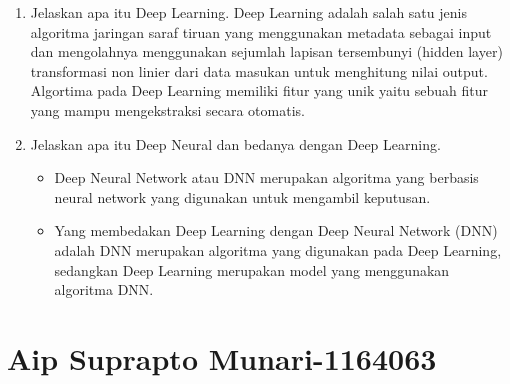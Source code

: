 \begin{enumerate}
\item Jelaskan apa itu Deep Learning.
\subitem Deep Learning adalah salah satu jenis algoritma jaringan saraf tiruan yang menggunakan metadata sebagai input dan mengolahnya menggunakan sejumlah lapisan tersembunyi (hidden layer) transformasi non linier dari data masukan untuk menghitung nilai output. Algortima pada Deep Learning memiliki fitur yang unik yaitu sebuah fitur yang mampu mengekstraksi secara otomatis.

\item Jelaskan apa itu Deep Neural dan bedanya dengan Deep Learning.
\begin{itemize}
\item Deep Neural Network atau DNN merupakan algoritma yang berbasis neural network yang digunakan untuk mengambil keputusan.

\item Yang membedakan Deep Learning dengan  Deep Neural Network (DNN) adalah DNN merupakan algoritma yang digunakan pada Deep Learning, sedangkan Deep Learning merupakan model yang menggunakan algoritma DNN.
\end{itemize}
\end{enumerate}

\section{Aip Suprapto Munari-1164063}
